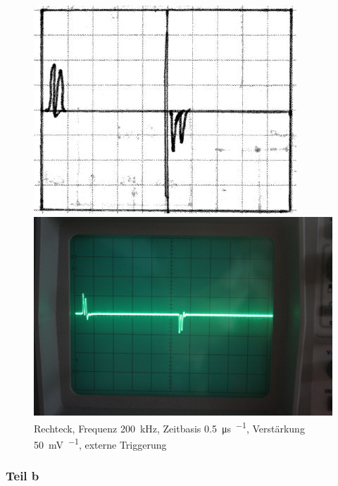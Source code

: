 \begin{figure}[htbp]
	\centering
	\begin{minipage}{.45\linewidth}
	\includegraphics[width=\linewidth]{Skizzen/IMG_0765-1500.jpg}
	\end{minipage}
	\hfill
	\begin{minipage}{.45\linewidth}
	\includegraphics[width=\linewidth]{Fotos/IMG_0765-1500.jpg}
	\end{minipage}
	\caption{%
		Rechteck, Frequenz \SI{200}{\kilo\hertz},
		Zeitbasis \SI{.5}{\micro\second\per\division},
		Verstärkung \SI{50}{\milli\volt\per\division},
		externe Triggerung
	}
	\label{fig:0765}
\end{figure}

\FloatBarrier
\subsubsection{Teil b}

